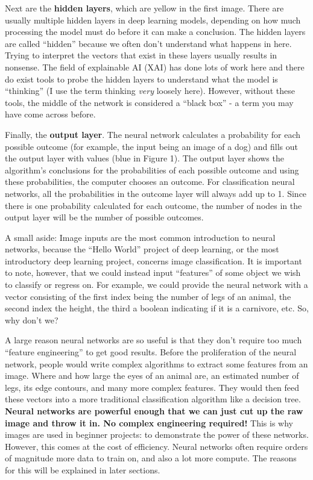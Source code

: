 \begin{flushleft}
    \large {Next are the \textbf{hidden layers}, which are yellow in the first image. There are usually multiple hidden layers in deep learning models, depending on how much processing the model must do before it can make a conclusion. The hidden layers are called ``hidden'' because we often don't understand what happens in here. Trying to interpret the vectors that exist in these layers usually results in nonsense. The field of explainable AI (XAI) has done lots of work here and there do exist tools to probe the hidden layers to understand what the model is ``thinking'' (I use the term thinking \textit{very} loosely here). However, without these tools, the middle of the network is considered a ``black box'' - a term you may have come across before. \break
    
    Finally, the \textbf{output layer}. The neural network calculates a probability for each possible outcome (for example, the input being an image of a dog) and fills out the output layer with values (blue in Figure 1). The output layer shows the algorithm's conclusions for the probabilities of each possible outcome and using these probabilities, the computer chooses an outcome. For classification neural networks, all the probabilities in the outcome layer will always add up to 1. Since there is one probability calculated for each outcome, the number of nodes in the output layer will be the number of possible outcomes. \break
    
    A small aside: Image inputs are the most common introduction to neural networks, because the ``Hello World'' project of deep learning, or the most introductory deep learning project, concerns image classification. It is important to note, however, that we could instead input ``features'' of some object we wish to classify or regress on. For example, we could provide the neural network with a vector consisting of the first index being the number of legs of an animal, the second index the height, the third a boolean indicating if it is a carnivore, etc. So, why don't we? \break
    
    A large reason neural networks are so useful is that they don't require too much ``feature engineering'' to get good results. Before the proliferation of the neural network, people would write complex algorithms to extract some features from an image. Where and how large the eyes of an animal are, an estimated number of legs, its edge contours, and many more complex features. They would then feed these vectors into a more traditional classification algorithm like a decision tree. \textbf{Neural networks are powerful enough that we can just cut up the raw image and throw it in. No complex engineering required!} This is why images are used in beginner projects: to demonstrate the power of these networks. However, this comes at the cost of efficiency. Neural networks often require orders of magnitude more data to train on, and also a lot more compute. The reasons for this will be explained in later sections.}
\end{flushleft}
